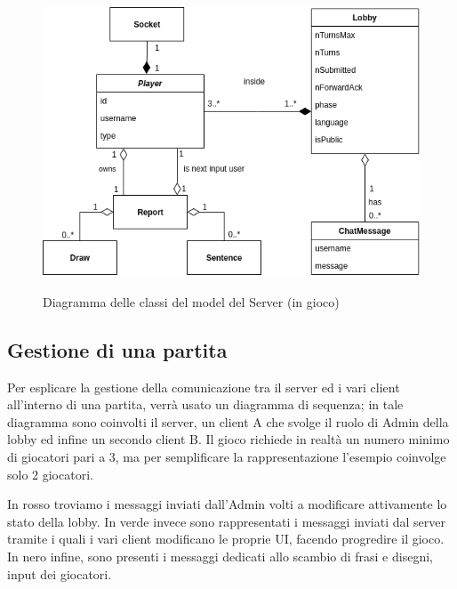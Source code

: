 \begin{figure}[H]
    \caption{Diagramma delle classi del model del Server (in gioco)}
    \centering
    \includegraphics[width=\linewidth]{img/uml/guessr_server_model.png}
    \label{fig:guessr_server_model}
\end{figure}

\subsection{Gestione di una partita}
Per esplicare la gestione della comunicazione tra il server ed i vari client all'interno di una partita, verrà usato un diagramma di sequenza; in tale diagramma sono coinvolti il server, un client A che svolge il ruolo di Admin della lobby ed infine un secondo client B.\newline
Il gioco richiede in realtà un numero minimo di giocatori pari a 3, ma per semplificare la rappresentazione l'esempio coinvolge solo 2 giocatori.\newline

\noindent In rosso troviamo i messaggi inviati dall'Admin volti a modificare attivamente lo stato della lobby.\newline
In verde invece sono rappresentati i messaggi inviati dal server tramite i quali i vari client modificano le proprie UI, facendo progredire il gioco.\newline
In nero infine, sono presenti i messaggi dedicati allo scambio di frasi e disegni, input dei giocatori.

